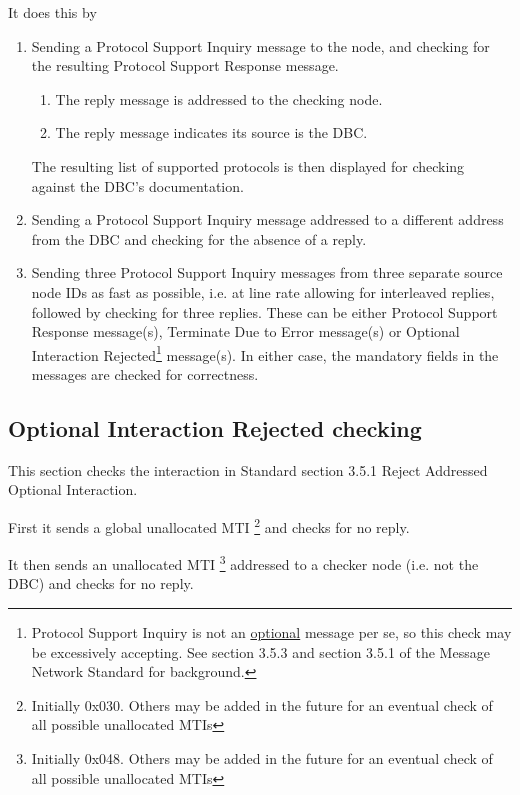 It does this by 
\begin{enumerate}
\item Sending a Protocol Support Inquiry message to the node, 
and checking for the resulting Protocol Support Response message.  
    \begin{enumerate}
    \item The reply message is addressed to the checking node.
    \item The reply message indicates its source is the DBC.
    \end{enumerate}

The resulting list of supported protocols is then displayed for checking against the 
DBC's documentation.

\item Sending a Protocol Support Inquiry message addressed to a different address from the DBC
        and checking for the absence of a reply.
        
\item Sending three Protocol Support Inquiry messages from three separate source node IDs
        as fast as possible, i.e. at line rate allowing for interleaved replies, 
        followed by checking for three replies.  These can be either Protocol Support 
        Response message(s), 
        Terminate Due to Error message(s)
        or Optional Interaction Rejected\footnote{
            Protocol Support Inquiry is not an \underline{optional} message per se, 
            so this check may be excessively accepting. See section 3.5.3 and
            section 3.5.1 of the Message Network Standard for background.
        }
        message(s).  In either
        case, the mandatory fields in the messages are checked for correctness.
\end{enumerate}


\subsection{Optional Interaction Rejected checking}

This section checks the interaction in Standard section 3.5.1 Reject Addressed Optional Interaction.

First it sends a global unallocated MTI
\footnote{Initially 0x030. Others may be added in the future for an eventual
    check of all possible unallocated MTIs}
and checks for no reply.

It then sends an unallocated MTI
\footnote{Initially 0x048. Others may be added in the future for an eventual
    check of all possible unallocated MTIs}
addressed to a checker node (i.e. not the DBC)
and checks for no reply.

